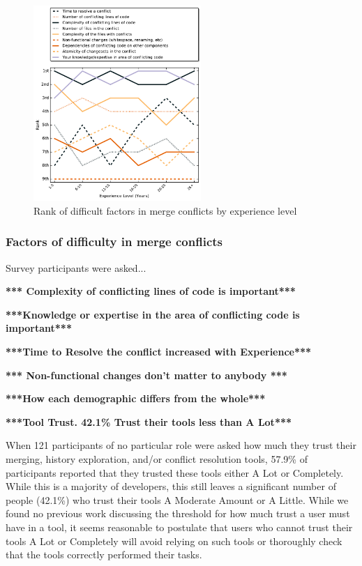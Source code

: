 \documentclass[conference]{IEEEtran}
\begin{document}
\begin{figure}[!t]
\centering
\includegraphics[width=2.5in]{ExpVsRankConDiff.pdf}
\caption{Rank of difficult factors in merge conflicts by experience level}
\label{con_diff_rank}
\end{figure}

\subsubsection{Factors of difficulty in merge conflicts}
Survey participants were asked...

\textbf{*** Complexity of conflicting lines of code is important***}

\textbf{***Knowledge or expertise in the area of conflicting code is important***}

\textbf{***Time to Resolve the conflict increased with Experience***}

\textbf{*** Non-functional changes don't matter to anybody ***}

\textbf{***How each demographic differs from the whole***}

\textbf{***Tool Trust. 42.1\% Trust their tools less than A Lot***}

When 121 participants of no particular role were asked how much they trust their merging, history exploration, and/or conflict resolution tools, 57.9\% of participants reported that they trusted these tools either A Lot or Completely. While this is a majority of developers, this still leaves a significant number of people (42.1\%) who trust their tools A Moderate Amount or A Little. While we found no previous work discussing the threshold for how much trust a user must have in a tool, it seems reasonable to postulate that users who cannot trust their tools A Lot or Completely will avoid relying on such tools or thoroughly check that the tools correctly performed their tasks. 
\end{document}
